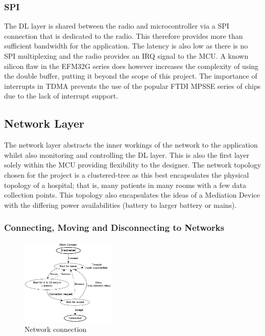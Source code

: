 \subsubsection{\acf{SPI}}
The \ac{DL} layer is shared between the radio and microcontroller via a \ac{SPI} connection that is dedicated
to the radio. This therefore provides more than sufficient bandwidth for the application. The latency
is also low as there is no \ac{SPI} multiplexing and the radio provides an \ac{IRQ} signal to the \ac{MCU}.
A known silicon flaw in the EFM32G series does however increases the complexity of using the
double buffer, putting it beyond the scope of this project. The importance
of interrupts in \ac{TDMA} prevents the use of the popular FTDI \ac{MPSSE} series of chips due to the lack of
interrupt support.

\subsection{Network Layer}
The network layer abstracts the inner workings of the network to the application whilst also
monitoring and controlling the \ac{DL} layer. This is also the first layer solely within the \ac{MCU}
providing flexibility to the designer.
The network topology chosen for the project is a clustered-tree as this best encapsulates the
physical topology of a hospital; that is, many patients in many rooms with a few data collection
points. This topology also encapsulates the ideas of a Mediation Device with the differing power
availabilities (battery to larger battery or mains).

\subsubsection{Connecting, Moving and Disconnecting to Networks}

\begin{figure}
  \vspace{-10pt}
  \begin{center}
    \includegraphics[width=0.4\textwidth, keepaspectratio=true]{images/Network_Connect.png}
  \end{center}
  \caption[Network Connection]{Network connection}
  \label{fig:net_connect}
  \vspace{-10pt}
\end{figure}

